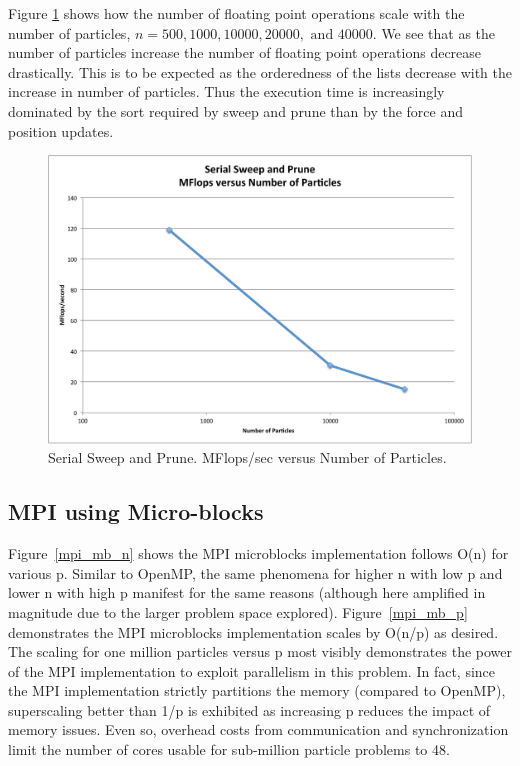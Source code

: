 \documentclass[11pt]{article} %
\begin{document}
Figure \ref{plot:serial_flops_v_n} shows how the number of floating
point operations scale with the number of particles, $n=500,1000,10000,20000,\text{ and }40000$.
We see that as the number of particles increase the number of floating
point operations decrease drastically. This is to be expected as the
orderedness of the lists decrease with the increase in number of particles.
Thus the execution time is increasingly dominated by the sort required
by sweep and prune than by the force and position updates.

\begin{figure}
\begin{centering}
\includegraphics[width=0.5\paperwidth]{figures/serial_flops_v_n}
\par\end{centering}

\caption{Serial Sweep and Prune. MFlops/sec versus Number of Particles.}
\label{plot:serial_flops_v_n}
\end{figure}


\subsection{MPI using Micro-blocks}

Figure~\ref{mpi_mb_n} shows the MPI microblocks implementation follows O(n) for various p. Similar to OpenMP, the same phenomena for higher n with low p and lower n with high p manifest for the same reasons (although here amplified in magnitude due to the larger problem space explored). Figure~\ref{mpi_mb_p} demonstrates the MPI microblocks implementation scales by O(n/p) as desired. The scaling for one million particles versus p most visibly demonstrates the power of the MPI implementation to exploit parallelism in this problem. In fact, since the MPI implementation strictly partitions the memory (compared to OpenMP), superscaling better than 1/p is exhibited as increasing p reduces the impact of memory issues. Even so, overhead costs from communication and synchronization limit the number of cores usable for sub-million particle problems to 48.
\end{document}
